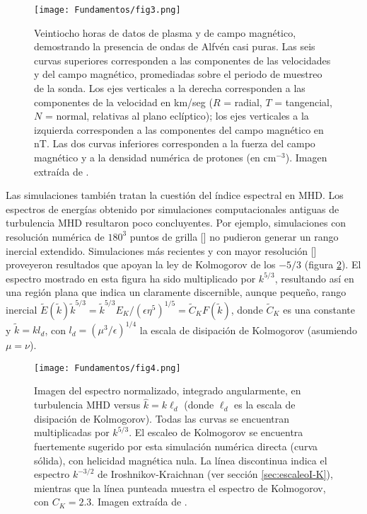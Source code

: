 \begin{figure}[h]
  \centering
  \texttt{[image: Fundamentos/fig3.png]}
  \caption{Veintiocho horas de datos de plasma y de campo magnético,
    demostrando la presencia de ondas de Alfv\'en casi puras. Las seis
    curvas superiores corresponden a las componentes de las
    velocidades y del campo magnético, promediadas sobre el periodo de
    muestreo de la sonda. Los ejes verticales a la derecha
    corresponden a las componentes de la velocidad en km/seg ($R$ =
    radial, $T$ = tangencial, $N$ = normal, relativas al plano
    eclíptico); los ejes verticales a la izquierda corresponden a las
    componentes del campo magnético en nT. Las dos curvas inferiores
    corresponden a la fuerza del campo magnético y a la densidad
    numérica de protones (en cm$^{-3}$). Imagen extraída de
    \cite{belcher_large-amplitude_1971}.}
  \label{fig:equiparticion}
\end{figure}

Las simulaciones también tratan la cuestión del índice espectral en
MHD. Los espectros de energías obtenido por simulaciones
computacionales antiguas de turbulencia MHD resultaron poco
concluyentes. Por ejemplo, simulaciones con resolución numérica de
$180^3$ puntos de grilla [\cite{politano_current_1995}] no pudieron
generar un rango inercial extendido. Simulaciones más recientes y con
mayor resolución [\cite{biskamp_scaling_2000}] proveyeron resultados
que apoyan la ley de Kolmogorov de los $-5/3$
(figura \ref{fig:normalizedspectrum}). El espectro mostrado en esta
figura ha sido multiplicado por $k^{5/3}$, resultando así en una
región plana que indica un claramente discernible, aunque pequeño,
rango inercial $\tilde{E}(\tilde{k})\tilde{k}^{5/3} =
\tilde{k}^{5/3}E_K/\left(\epsilon\eta^5\right)^{1/5} = \tilde{C}_K
F(\tilde{k})$, donde $\tilde{C}_K$ es una constante y
$\tilde{k}=kl_d$, con $l_d=\left(\mu^3/\epsilon\right)^{1/4}$ la
escala de disipación de Kolmogorov (asumiendo $\mu=\nu$).

\begin{figure}[h]
  \centering
  \texttt{[image: Fundamentos/fig4.png]}
  \caption{Imagen del espectro normalizado, integrado angularmente,
    en turbulencia MHD versus $\hat{k} = k\ell_d$ (donde $\ell_d$ es
    la escala de disipación de Kolmogorov). Todas las curvas se
    encuentran multiplicadas por $k^{5/3}$. El escaleo de Kolmogorov
    se encuentra fuertemente sugerido por esta simulación numérica
    directa (curva sólida), con helicidad magnética nula. La línea
    discontinua indica el espectro $k^{-3/2}$ de Iroshnikov-Kraichnan
    (ver sección \ref{sec:escaleoI-K}), mientras que la línea punteada
    muestra el espectro de Kolmogorov, con $C_K = 2.3$. Imagen
    extraída de \cite{biskamp_scaling_2000}.}
  \label{fig:normalizedspectrum}
\end{figure}

